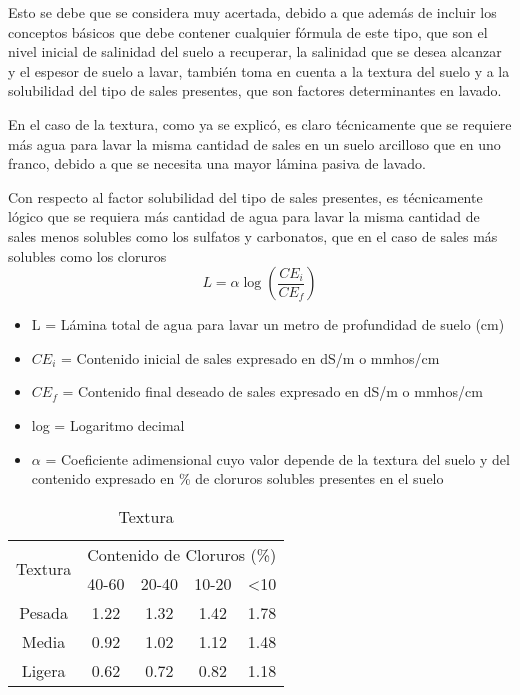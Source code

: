 Esto se debe que se considera muy acertada, debido a que además de incluir los conceptos básicos que debe contener cualquier fórmula de este tipo, que son el nivel inicial de salinidad del suelo a recuperar, la salinidad que se desea alcanzar y el espesor de suelo a lavar, también toma en cuenta a la textura del suelo y a la solubilidad del tipo de sales presentes, que son factores determinantes en lavado.

En el caso de la textura, como ya se explicó, es claro técnicamente que se requiere más agua para lavar la misma cantidad de sales en un suelo arcilloso que en uno franco, debido a que se necesita una mayor lámina pasiva de lavado.

Con respecto al factor solubilidad del tipo de sales presentes, es técnicamente lógico que se requiera más cantidad de agua para lavar la misma cantidad de sales menos solubles como los sulfatos y carbonatos, que en el caso de sales más solubles como los cloruros
\begin{equation}
    L = \alpha \log{\left(\frac{CE_i}{CE_f}\right)}
\end{equation}
\begin{notation}
    \begin{itemize} En donde:
        \item L = Lámina total de agua para lavar un metro de profundidad de suelo (cm)
        \item $CE_i$ = Contenido inicial de sales expresado en dS/m o mmhos/cm
        \item $CE_f$ = Contenido final deseado de sales expresado en dS/m o mmhos/cm
        \item log = Logaritmo decimal
        \item $\alpha$ = Coeficiente adimensional cuyo valor depende de la textura del suelo y del contenido expresado en \% de cloruros solubles presentes en el suelo
    \end{itemize}
\end{notation}
\begin{table}[h!]
    \centering
    \begin{tabular}{@{}ccccc@{}}
    \toprule
    \multirow{2}{*}{Textura} & \multicolumn{4}{c}{Contenido de Cloruros (\%)} \\ \cmidrule(l){2-5} 
                             & 40-60    & 20-40   & 10-20   & \textless{}10   \\ \midrule
    Pesada                   & 1.22     & 1.32    & 1.42    & 1.78            \\
    Media                    & 0.92     & 1.02    & 1.12    & 1.48            \\
    Ligera                   & 0.62     & 0.72    & 0.82    & 1.18            \\ \bottomrule
    \end{tabular}
    \caption{Textura}
    \label{tabsa35}
\end{table}

